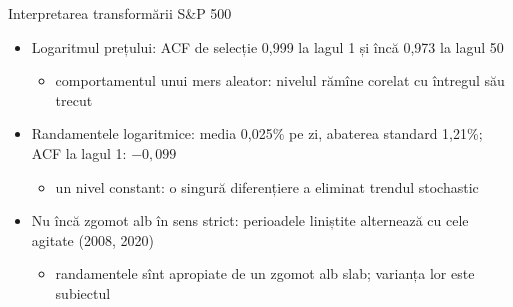 \begin{frame}{Interpretarea transformării S\&P 500}
\itemsize{\small}
\begin{itemize}
    \item Logaritmul prețului: ACF de selecție 0{,}999 la lagul 1 și încă 0{,}973 la lagul 50
    \begin{itemize}
        \item comportamentul unui mers aleator: nivelul rămîne corelat cu întregul său trecut
    \end{itemize}
    \item Randamentele logaritmice: media 0{,}025\% pe zi, abaterea standard 1{,}21\%; ACF la lagul 1: $\ensuremath{-}0{,}099$
    \begin{itemize}
        \item un nivel constant: o singură diferențiere a eliminat trendul stochastic
    \end{itemize}
    \item Nu încă zgomot alb în sens strict: perioadele liniștite alternează cu cele agitate (2008, 2020)
    \begin{itemize}
        \item randamentele sînt apropiate de un zgomot alb slab; varianța lor este subiectul 
    \end{itemize}
\end{itemize}
\end{frame}

